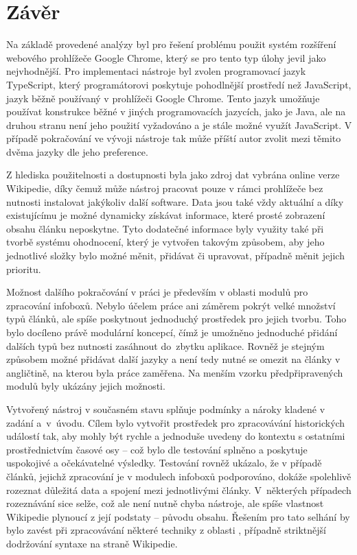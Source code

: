 \chapter{Závěr}
Na základě provedené analýzy byl pro řešení problému použit systém rozšíření webového prohlížeče Google Chrome, který se pro tento typ úlohy jevil jako nejvhodnější. Pro implementaci nástroje byl zvolen programovací jazyk TypeScript, který programátorovi poskytuje pohodlnější prostředí než JavaScript, jazyk běžně používaný v prohlížeči Google Chrome. Tento jazyk umožňuje používat konstrukce běžné v jiných programovacích jazycích, jako je Java, ale na druhou stranu není jeho použití vyžadováno a je stále možné využít JavaScript. V případě pokračování ve vývoji nástroje tak může příští autor zvolit mezi těmito dvěma jazyky dle jeho preference.

Z hlediska použitelnosti a dostupnosti byla jako zdroj dat vybrána online verze Wikipedie, díky čemuž může nástroj pracovat pouze v rámci prohlížeče bez nutnosti instalovat jakýkoliv další software. Data jsou také vždy aktuální a díky existujícímu  je možné dynamicky získávat informace, které prosté zobrazení obsahu článku neposkytne. Tyto dodatečné informace byly využity také při tvorbě systému ohodnocení, který je vytvořen takovým způsobem, aby jeho jednotlivé složky bylo možné měnit, přidávat či upravovat, případně měnit jejich prioritu.

Možnost dalšího pokračování v práci je především v oblasti modulů pro zpracování infoboxů. Nebylo účelem práce ani záměrem pokrýt velké množství typů článků, ale spíše poskytnout jednoduchý prostředek pro jejich tvorbu. Toho bylo docíleno právě modulární koncepcí, čímž je umožněno jednoduché přidání dalších typů bez nutnosti zasáhnout do~zbytku aplikace. Rovněž je stejným způsobem možné přidávat další jazyky a není tedy nutné se omezit na články v angličtině, na kterou byla práce zaměřena. Na menším vzorku předpřipravených modulů byly ukázány jejich možnosti.

Vytvořený nástroj v současném stavu splňuje podmínky a nároky kladené v zadání a~v~úvodu. Cílem bylo vytvořit prostředek pro zpracovávání historických událostí tak, aby mohly být rychle a jednoduše uvedeny do kontextu s ostatními prostřednictvím časové osy -- což bylo dle testování splněno a poskytuje uspokojivé a očekávatelné výsledky. Testování rovněž ukázalo, že v případě článků, jejichž zpracování je v modulech infoboxů podporováno, dokáže spolehlivě rozeznat důležitá data a spojení mezi jednotlivými články. V~některých případech rozeznávání sice selže, což ale není nutně chyba nástroje, ale spíše vlastnost Wikipedie plynoucí z její podstaty -- původu obsahu. Řešením pro tato selhání by bylo zavést při zpracovávání některé techniky z oblasti , případně striktnější dodržování syntaxe na straně Wikipedie.
